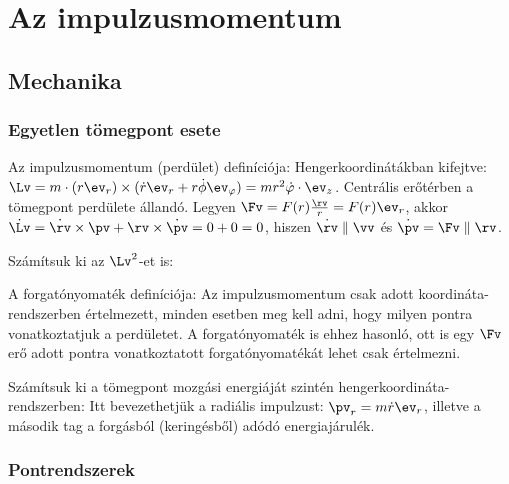 \chapter{Az impulzusmomentum}

 \section{Mechanika}
  
  \subsection{Egyetlen tömegpont esete}
 
   Az impulzusmomentum (perdület) definíciója: 
   Hengerkoordinátákban kifejtve: $\Lv=m\cdot(r\ev_r)\times(\dot{r}\ev_r+r\dot{\phi}\ev_\varphi)=mr^2\dot{\varphi}\cdot\ev_z$.
   Centrális erőtérben a tömegpont perdülete állandó.
   Legyen $\Fv=F(r)\frac{\rv}{r}=F(r)\ev_r$, akkor $\dot{\Lv}=\dot{\rv}\times\pv+\rv\times\dot\pv=0+0=0$, hiszen $\dot\rv\parallel \vv$ és $\dot\pv=\Fv\parallel\rv$.
   
   Számítsuk ki az $\Lv^2$-et is:
   
   A forgatónyomaték definíciója:
   Az impulzusmomentum csak adott koordináta-rendszerben értelmezett, minden esetben meg kell adni, hogy milyen pontra vonatkoztatjuk a perdületet.
   A forgatónyomaték is ehhez hasonló, ott is egy $\Fv$ erő adott pontra vonatkoztatott forgatónyomatékát lehet csak értelmezni.
   
   Számítsuk ki a tömegpont mozgási energiáját szintén hengerkoordináta-rendszerben:
   Itt bevezethetjük a radiális impulzust: $\pv_r=m\dot r\ev_r$, illetve a második tag a forgásból (keringésből) adódó energiajárulék. 
  
  \subsection{Pontrendszerek}\label{ss6:pontrendszerek}
   
